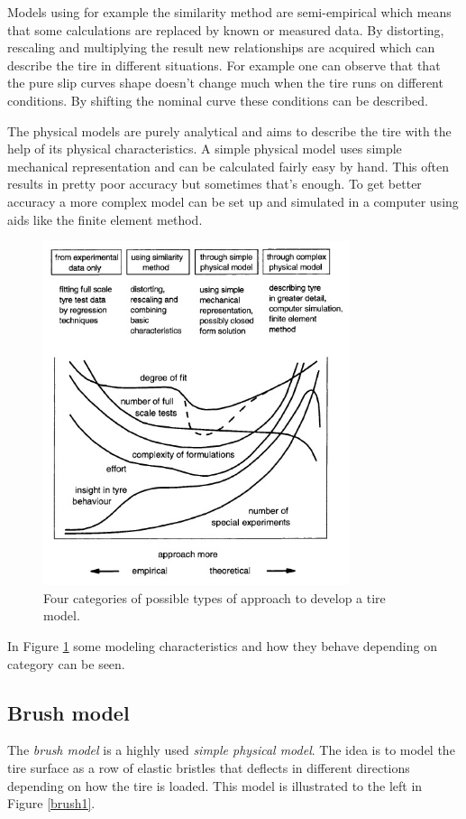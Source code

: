 Models using for example the similarity method are semi-empirical which means that some calculations are replaced by known or measured data. By distorting, rescaling and multiplying the result new relationships are acquired which can describe the tire in different situations. For example one can observe that that the pure slip curves shape doesn't change much \cite{pacejka} when the tire runs on different conditions. By shifting the nominal curve these conditions can be described.

The physical models are purely analytical and aims to describe the tire with the help of its physical characteristics. A simple physical model uses simple mechanical representation and can be calculated fairly easy by hand. This often results in pretty poor accuracy but sometimes that's enough. To get better accuracy a more complex model can be set up and simulated in a computer using aids like the finite element method. 

\begin{figure}[h]
	\centering
	\includegraphics[width=0.8\textwidth]{Pictures/tire_modeling}
	\caption{Four categories of possible types of approach to develop a tire model. \cite{pacejka}}
	\label{tire_modeling}
\end{figure}

In Figure \ref{tire_modeling} some modeling characteristics and how they behave depending on category can be seen.

\subsection{Brush model}
\label{sec:brush}
The \textit{brush model} is a highly used \textit{simple physical model}. The idea is to model the tire surface as a row of elastic bristles that deflects in different directions depending on how the tire is loaded. This model is illustrated to the left in Figure \ref{brush1}.

